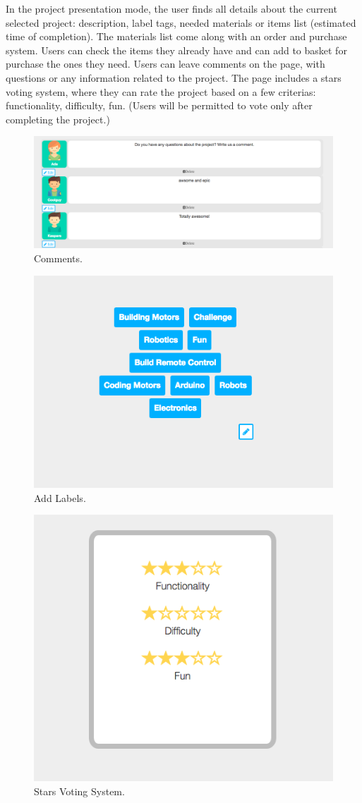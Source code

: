 In the project presentation mode, the user finds all details about the current selected project: description, label tags, needed materials or items list (estimated time of completion). The materials list come along with an order and purchase system. Users can check the items they already have and can add to basket for purchase the ones they need. 
Users can leave comments on the page, with questions or any information related to the project. The page includes a stars voting system, where they can rate the project based on a few criterias: functionality, difficulty, fun. (Users will be permitted to vote only after completing the project.)\\

\begin{figure}
\includegraphics[width=1\linewidth]{images/ui/Comments.png}
\caption{Comments.}
\label{fig:comments}
\end{figure}

\begin{figure}
\includegraphics[width=0.5\linewidth]{images/ui/AddLabels.png}
\caption{Add Labels.}
\label{fig:add_labels}
\end{figure}

\begin{figure}
\includegraphics[width=0.5\linewidth]{images/ui/StarsVotingSystem.png}
\caption{Stars Voting System.}
\label{fig:stars_voting_system}
\end{figure}

